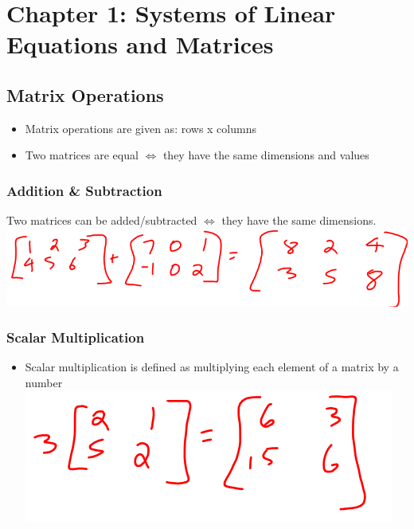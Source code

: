 \documentclass[
  letterpaper,
  DIV=11,
  numbers=noendperiod]{scrartcl}
\author{}
\date{}
\providecommand{\tightlist}{%
  \setlength{\itemsep}{0pt}\setlength{\parskip}{0pt}}\usepackage{longtable,booktabs,array}
\renewcommand*\contentsname{Table of contents}
\newcommand\contentsname{Table of contents}
\begin{document}

\newpage

\renewcommand*\contentsname{Table of Contents}
{
\hypersetup{linkcolor=}
\setcounter{tocdepth}{4}
\tableofcontents
}
\newpage{}

\section{Chapter 1: Systems of Linear Equations and
Matrices}\label{chapter-1-systems-of-linear-equations-and-matrices}

\subsection{Matrix Operations}\label{matrix-operations}

\begin{itemize}
\tightlist
\item
  Matrix operations are given as: rows x columns
\item
  Two matrices are equal \(\iff\) they have the same dimensions and
  values
\end{itemize}

\subsubsection{Addition \& Subtraction}\label{addition-subtraction}

Two matrices can be added/subtracted \(\iff\) they have the same
dimensions. \includegraphics{img/addition-subtraction.png}

\subsubsection{Scalar Multiplication}\label{scalar-multiplication}

\begin{itemize}
\tightlist
\item
  Scalar multiplication is defined as multiplying each element of a
  matrix by a number \includegraphics{img/scalar.png}
\end{itemize}
\end{document}
